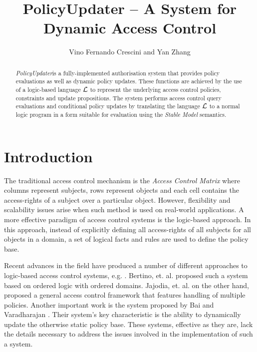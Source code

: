 \documentclass[global,twocolumn,draft]{svjour}
\begin{document}
  \title{PolicyUpdater -- A System for Dynamic Access Control}
  \author{Vino Fernando Crescini and Yan Zhang}

  \maketitle

  \begin{abstract}
    {\em PolicyUpdater}\footnotemark is a fully-implemented authorisation
    system that provides policy evaluations as well as dynamic policy updates.
    These functions are achieved by the use of a logic-based language
    ${\cal L}$ to represent the underlying access control policies, constraints
    and update propositions. The system performs access control query
    evaluations and conditional policy updates by translating the language
    $\cal{L}$ to a normal logic program in a form suitable for evaluation using
    the {\em Stable Model} semantics.
  \end{abstract}


  \section{Introduction}

    The traditional access control mechanism is the {\em Access Control Matrix}
    where columns represent subjects, rows represent objects and each cell
    contains the access-rights of a subject over a particular object. However,
    flexibility and scalability issues arise when such method is used on
    real-world applications. A more effective paradigm of access control
    systems is the logic-based approach. In this approach, instead of
    explicitly defining all access-rights of all subjects for all objects
    in a domain, a set of logical facts and rules are used to define the
    policy base.

    Recent advances in the field have produced a number of different approaches
    to logic-based access control systems, e.g. \cite{HAL,LI}. Bertino, et. al.
    \cite{BE1} proposed such a system based on ordered logic with ordered
    domains. Jajodia, et. al. \cite{JAJ} on the other hand, proposed a general
    access control framework that features handling of multiple policies.
    Another important work is the system proposed by Bai and Varadharajan
    \cite{BA1,BA2}. Their system's key characteristic is the ability to
    dynamically update the otherwise static policy base. These systems,
    effective as they are, lack the details necessary to address the issues
    involved in the implementation of such a system.
\end{document}
